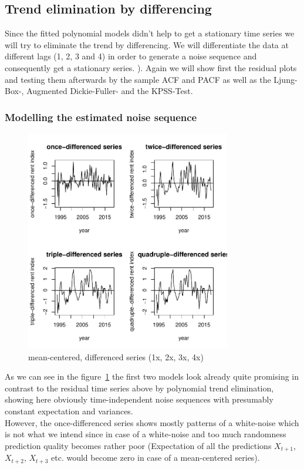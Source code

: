 \documentclass[11pt,a4paper]{article}
\begin{document}
\subsection{Trend elimination by differencing}
Since the fitted polynomial models didn't help to get a stationary time series we will try to eliminate the trend by differencing. We will differentiate the data at different lags (1, 2, 3 and 4) in order to generate a noise sequence and consequently get a stationary series. \cite[p.~35]{bd02}). Again we will show first the residual plots and testing them afterwards by the sample ACF and PACF as well as the Ljung-Box-, Augmented Dickie-Fuller- and the KPSS-Test.
\subsubsection{Modelling the estimated noise sequence}
\begin{figure}[!htb]
\centering
\includegraphics[angle=0,
width=0.8\textwidth]{resid_diff_all}
\caption{mean-centered, differenced series (1x, 2x, 3x, 4x)
\label{fig:resid_diff_all}}
\end{figure}
As we can see in the figure~\ref{fig:resid_diff_all} the first two models look already quite promising in contrast to the residual time series above by polynomial trend elimination, showing here obviously time-independent noise sequences with presumably constant expectation and variances. \\
However, the once-differenced series shows mostly patterns of a white-noise which is not what we intend since in case of a white-noise and too much randomness prediction quality becomes rather poor (Expectation of all the predictions $X_{t+1}$, $X_{t+2}$, $X_{t+3}$ etc. would become zero in case of a mean-centered series). 
\end{document}
